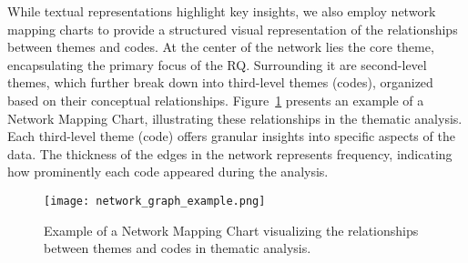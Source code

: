 While textual representations highlight key insights, we also employ network mapping charts to provide a structured visual representation of the relationships between themes and codes.
At the center of the network lies the core theme, encapsulating the primary focus of the RQ. Surrounding it are second-level themes, which further break down into third-level themes (codes), organized based on their conceptual relationships. Figure~\ref{fig:network_mapping_chart_example} presents an example of a Network Mapping Chart, illustrating these relationships in the thematic analysis.
Each third-level theme (code) offers granular insights into specific aspects of the data. The thickness of the edges in the network represents frequency, indicating how prominently each code appeared during the analysis.

\begin{figure}[H]
	\centering
	\texttt{[image: network\_graph\_example.png]}
	\caption{Example of a Network Mapping Chart visualizing the relationships between themes and codes in thematic analysis.}
	\label{fig:network_mapping_chart_example}       %
\end{figure}



